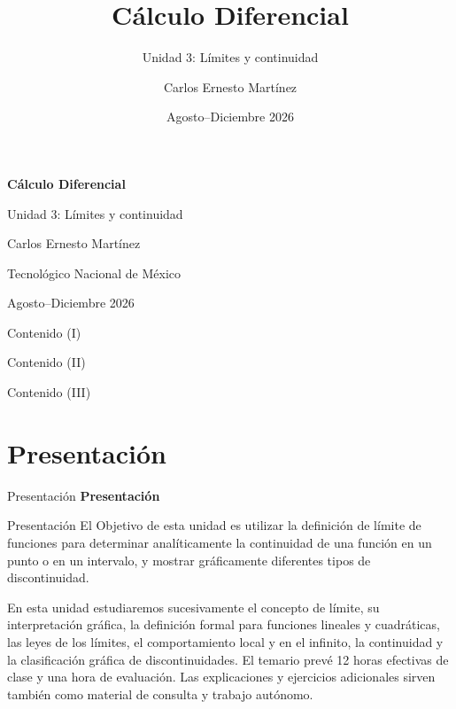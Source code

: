 \documentclass[12pt,aspectratio=169]{beamer}
\title{Cálculo Diferencial}
\subtitle{Unidad 3: Límites y continuidad}
\author{Carlos Ernesto Martínez}
\institute{Tecnológico Nacional de México}
\date{Agosto--Diciembre 2026}
\begin{document}
\begin{frame}[plain]
\centering\vspace{1.1cm}
{\Huge\bfseries\color{azul} Cálculo Diferencial}\par\vspace{.5cm}
{\LARGE Unidad 3: Límites y continuidad}\par\vspace{.65cm}
{\large Carlos Ernesto Martínez}\par\medskip
Tecnológico Nacional de México\par\vspace{.4cm}
{\small Agosto--Diciembre 2026}\par
\end{frame}
\begin{frame}[t]{Contenido (I)}
\tableofcontents[sections={1-5},hideallsubsections]
\end{frame}
\begin{frame}[t]{Contenido (II)}
\tableofcontents[sections={6-10},hideallsubsections]
\end{frame}
\begin{frame}[t]{Contenido (III)}
\tableofcontents[sections={11-14},hideallsubsections]
\end{frame}
\section{Presentación}

\begin{frame}[t]{Presentación}
\centering\vfill{\Large\bfseries\color{azul} Presentación}\vfill
\end{frame}


\begin{frame}[t,allowframebreaks]{Presentación}
El Objetivo de esta unidad es utilizar la definición de límite de funciones para determinar analíticamente la continuidad de una función en un punto o en un intervalo, y mostrar gráficamente diferentes tipos de discontinuidad.

En esta unidad estudiaremos sucesivamente el concepto de límite, su interpretación gráfica, la definición formal para funciones lineales y cuadráticas, las leyes de los límites, el comportamiento local y en el infinito, la continuidad y la clasificación gráfica de discontinuidades. El temario prevé 12 horas efectivas de clase y una hora de evaluación. Las explicaciones y ejercicios adicionales sirven también como material de consulta y trabajo autónomo.

\end{frame}
\end{document}
